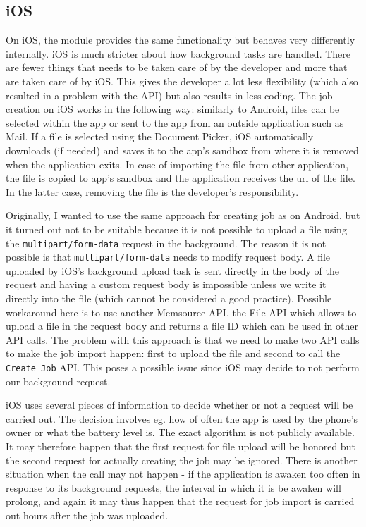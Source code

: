 \subsection{iOS}
On iOS, the module provides the same functionality but behaves very differently internally. iOS is much stricter about how background tasks are handled. There are fewer things that needs to be taken care of by the developer and more that are taken care of by iOS. This gives the developer a lot less flexibility (which also resulted in a problem with the API) but also results in less coding. The job creation on iOS works in the following way: similarly to Android, files can be selected within the app or sent to the app from an outside application such as Mail. If a file is selected using the Document Picker, iOS automatically downloads (if needed) and saves it to the app’s sandbox from where it is removed when the application exits. In case of importing the file from other application, the file is copied to app's sandbox and the application receives the url of the file. In the latter case, removing the file is the developer's responsibility.

Originally, I wanted to use the same approach for creating job as on Android, but it turned out not to be suitable because it is not possible to upload a file using the \texttt{multipart/form-data} request in the background. The reason it is not possible is that \texttt{multipart/form-data} needs to modify request body. A file uploaded by iOS's background upload task is sent directly in the body of the request and having a custom request body is impossible unless we write it directly into the file (which cannot be considered a good practice). Possible workaround here is to use another Memsource API, the File API which allows to upload a file in the request body and returns a file ID which can be used in other API calls. The problem with this approach is that we need to make two API calls to make the job import happen: first to upload the file and second to call the \texttt{Create Job} API. This poses a possible issue since iOS may decide to not perform our background request.

iOS uses several pieces of information to decide whether or not a request will be carried out. The decision involves eg. how of often the app is used by the phone's owner or what the battery level is. The exact algorithm is not publicly available. It may therefore happen that the first request for file upload will be honored but the second request for actually creating the job may be ignored. There is another situation when the call may not happen - if the application is awaken too often in response to its background requests, the interval in which it is be awaken will prolong, and again it may thus happen that the request for job import is carried out hours after the job was uploaded.

